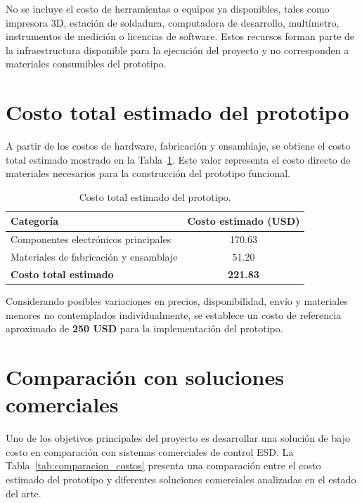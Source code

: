 No se incluye el costo de herramientas o equipos ya disponibles, tales como impresora 3D,
estación de soldadura, computadora de desarrollo, multímetro, instrumentos de medición o
licencias de software. Estos recursos forman parte de la infraestructura disponible para la
ejecución del proyecto y no corresponden a materiales consumibles del prototipo.

\section{Costo total estimado del prototipo}

A partir de los costos de hardware, fabricación y ensamblaje, se obtiene el costo total
estimado mostrado en la Tabla~\ref{tab:presupuesto_total}. Este valor representa el costo
directo de materiales necesarios para la construcción del prototipo funcional.

\begin{table}[H]
\centering
\caption{Costo total estimado del prototipo.}
\label{tab:presupuesto_total}
\begin{tabular}{p{8cm} c}
\toprule
\textbf{Categoría} & \textbf{Costo estimado (USD)} \\
\midrule
Componentes electrónicos principales & 170.63 \\
Materiales de fabricación y ensamblaje & 51.20 \\
\midrule
\textbf{Costo total estimado} & \textbf{221.83} \\
\bottomrule
\end{tabular}
\end{table}

Considerando posibles variaciones en precios, disponibilidad, envío y materiales menores
no contemplados individualmente, se establece un costo de referencia aproximado de
\textbf{250 USD} para la implementación del prototipo.

\section{Comparación con soluciones comerciales}

Uno de los objetivos principales del proyecto es desarrollar una solución de bajo costo en
comparación con sistemas comerciales de control ESD. La Tabla~\ref{tab:comparacion_costos}
presenta una comparación entre el costo estimado del prototipo y diferentes soluciones
comerciales analizadas en el estado del arte.

